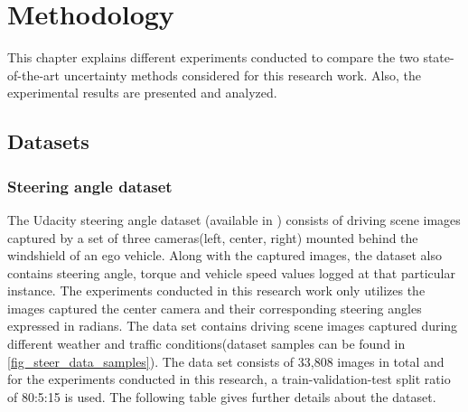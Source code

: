 

\chapter{Methodology}\label{chap_methodology}
This chapter explains different experiments conducted to compare the two state-of-the-art uncertainty methods considered for this research work. Also, the experimental results are presented and analyzed.
\section{Datasets}
\subsection{Steering angle dataset}
The Udacity steering angle dataset (available in \cite{udasteer}) consists of driving scene images captured by a set of three cameras(left, center, right) mounted behind the windshield of an ego vehicle. Along with the captured images, the dataset also contains steering angle, torque and vehicle speed values logged at that particular instance. The experiments conducted in this research work only utilizes the images captured the center camera and their corresponding steering angles expressed in radians. The data set contains driving scene images captured during different weather and traffic conditions(dataset samples can be found in \ref{fig_steer_data_samples}). The data set consists of 33,808 images in total and for the experiments conducted in this research, a train-validation-test split ratio of 80:5:15 is used. The following table gives further details about the dataset.

